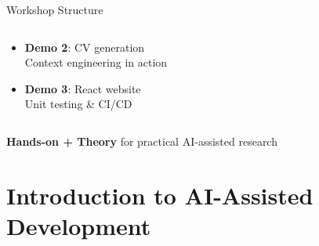 \documentclass[aspectratio=169]{beamer}
\begin{document}
\begin{frame}{Workshop Structure}
\begin{columns}[T]
\begin{column}{0.48\textwidth}
\begin{itemize}
        \vspace{0.3cm}
        
        \item \textbf{Demo 2}: CV generation\\
        \small Context engineering in action
        
        \vspace{0.3cm}
        
        \item \textbf{Demo 3}: React website\\
        \small Unit testing \& CI/CD
      \end{itemize}
    \end{column}
  \end{columns}

  \vspace{0.5cm}
  \centering
  \normalsize
  \textbf{Hands-on + Theory} for practical AI-assisted research
\end{frame}

\section{Introduction to AI-Assisted Development}
\end{document}
